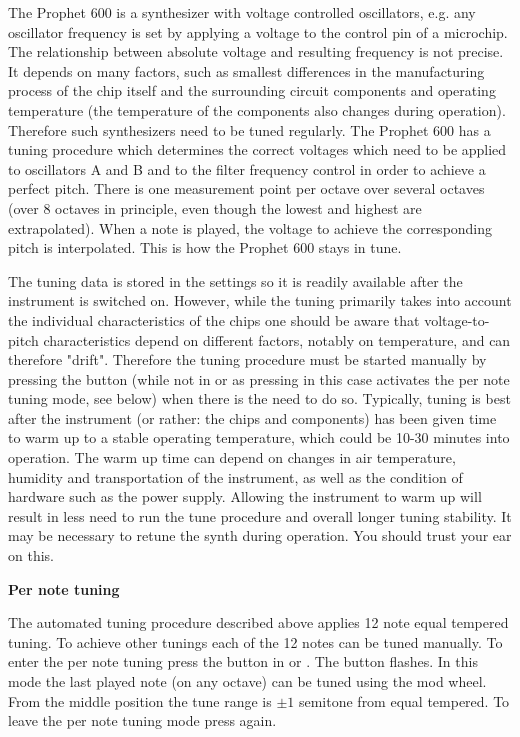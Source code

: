 The Prophet 600 is a synthesizer with voltage controlled oscillators, e.g. any oscillator frequency is set by applying a voltage to the control pin of a microchip. The relationship between absolute voltage and resulting frequency is not precise. It depends on many factors, such as smallest differences in the manufacturing process of the chip itself and the surrounding circuit components and operating temperature (the temperature of the components also changes during operation). Therefore such synthesizers need to be tuned regularly.  The Prophet 600 has a tuning procedure which determines the correct voltages which need to be applied to oscillators A and B and to the filter frequency control in order to achieve a perfect pitch. There is one measurement point per octave over several octaves (over 8 octaves in principle, even though the lowest and highest are extrapolated). When a note is played, the voltage to achieve the corresponding pitch is interpolated. This is how the Prophet 600 stays in tune. 

The tuning data is stored in the settings so it is readily available after the instrument is switched on. However, while the tuning primarily takes into account the individual characteristics of the chips one should be aware that voltage-to-pitch characteristics depend on different factors, notably on temperature, and can therefore "drift". Therefore the tuning procedure must be started manually by pressing the \tune button (while not in \shiftmode or \shiftlock as pressing \tune in this case activates the per note tuning mode, see below) when there is the need to do so. Typically, tuning is best after the instrument (or rather: the chips and components) has been given time to warm up to a stable operating temperature, which could be 10-30 minutes into operation. The warm up time can depend on changes in air temperature, humidity and transportation of the instrument, as well as the condition of hardware such as the power supply.  Allowing the instrument to warm up will result in less need to run the tune procedure and overall longer tuning stability. It may be necessary to retune the synth during operation. You should trust your ear on this.

\textbf{Per note tuning}

The automated tuning procedure described above applies 12 note equal tempered tuning. To achieve other tunings each of the 12 notes can be tuned manually. To enter the per note tuning press the \tune button in \shiftmode or \shiftlock. The \tune button flashes. In this mode the last played note (on any octave) can be tuned using the mod wheel. From the middle position the tune range is $\pm 1$ semitone from equal tempered. To leave the per note tuning mode press \tune again.

